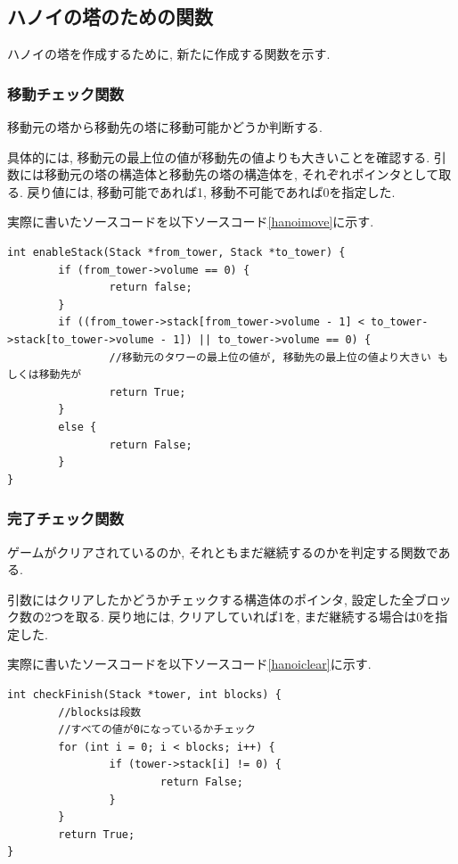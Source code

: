 \documentclass[a4j]{jsarticle}
\begin{document}
    \subsection{ハノイの塔のための関数}
        ハノイの塔を作成するために, 新たに作成する関数を示す. 
        \subsubsection{移動チェック関数}
        移動元の塔から移動先の塔に移動可能かどうか判断する. 
        
        具体的には, 移動元の最上位の値が移動先の値よりも大きいことを確認する. 
        引数には移動元の塔の構造体と移動先の塔の構造体を, それぞれポインタとして取る. 戻り値には, 移動可能であれば1, 移動不可能であれば0を指定した. 
        
        実際に書いたソースコードを以下ソースコード\ref{hanoimove}に示す. 
        \begin{lstlisting}[label = hanoimove, caption = 移動チェック関数]
int enableStack(Stack *from_tower, Stack *to_tower) {
        if (from_tower->volume == 0) {
                return false;
        }
        if ((from_tower->stack[from_tower->volume - 1] < to_tower->stack[to_tower->volume - 1]) || to_tower->volume == 0) {
                //移動元のタワーの最上位の値が, 移動先の最上位の値より大きい もしくは移動先が
                return True;
        }
        else {
                return False;
        }
}
        \end{lstlisting}
        \subsubsection{完了チェック関数}
        ゲームがクリアされているのか, それともまだ継続するのかを判定する関数である. 
        
        引数にはクリアしたかどうかチェックする構造体のポインタ, 設定した全ブロック数の2つを取る. 戻り地には, クリアしていれば1を, まだ継続する場合は0を指定した. 
        
        実際に書いたソースコードを以下ソースコード\ref{hanoiclear}に示す. 
        \begin{lstlisting}[label = hanoiclear, caption = 完了チェック関数]
int checkFinish(Stack *tower, int blocks) {
        //blocksは段数
        //すべての値が0になっているかチェック
        for (int i = 0; i < blocks; i++) {
                if (tower->stack[i] != 0) {
                        return False;
                }
        }
        return True;
}
        \end{lstlisting}
        
\end{document}
